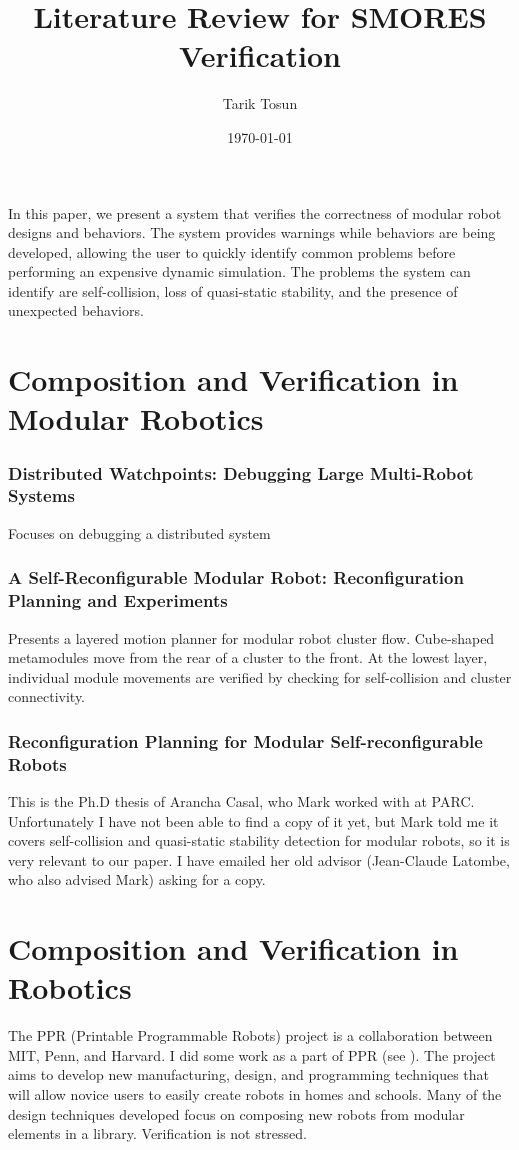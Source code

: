 \documentclass[12pt]{article}
\title{Literature Review for SMORES Verification}
\author{Tarik Tosun}
\date{\today}
\begin{document}
\maketitle

In this paper, we present a system that verifies the correctness of modular robot designs and behaviors.  The system provides warnings while behaviors are being developed, allowing the user to quickly identify common problems before performing an expensive dynamic simulation. The problems the system can identify are self-collision, loss of quasi-static stability, and the presence of unexpected behaviors.

\section*{Composition and Verification in Modular Robotics}
\subsubsection*{Distributed Watchpoints: Debugging Large Multi-Robot Systems \cite{de2008distributed} }
Focuses on debugging a distributed system

\subsubsection*{A Self-Reconfigurable Modular Robot: Reconfiguration Planning and Experiments \cite{yoshida2002self} }
Presents a layered motion planner for modular robot cluster flow. Cube-shaped metamodules move from the rear of a cluster to the front. At the lowest layer, individual module movements are verified by checking for self-collision and cluster connectivity.

\subsubsection*{Reconfiguration Planning for Modular Self-reconfigurable Robots \cite{casal2002}}
This is the Ph.D thesis of Arancha Casal, who Mark worked with at PARC.  Unfortunately I have not
been able to find a copy of it yet, but Mark told me it covers self-collision and
quasi-static stability detection for modular robots, so it is very relevant to our
paper.  I have emailed her old advisor (Jean-Claude Latombe, who also advised Mark)
asking for a copy.
 
\section*{Composition and Verification in Robotics }
The PPR (Printable Programmable Robots) project is a collaboration between MIT, Penn,
and Harvard.  I did some work as a part of PPR (see \cite{mantzouratos2014embeddability}).
The project aims to develop new manufacturing, design, and programming techniques that will allow
novice users to easily create robots in homes and schools.  Many of the design techniques
developed focus on composing new robots from modular elements in a library. Verification
is not stressed. 
\end{document}
